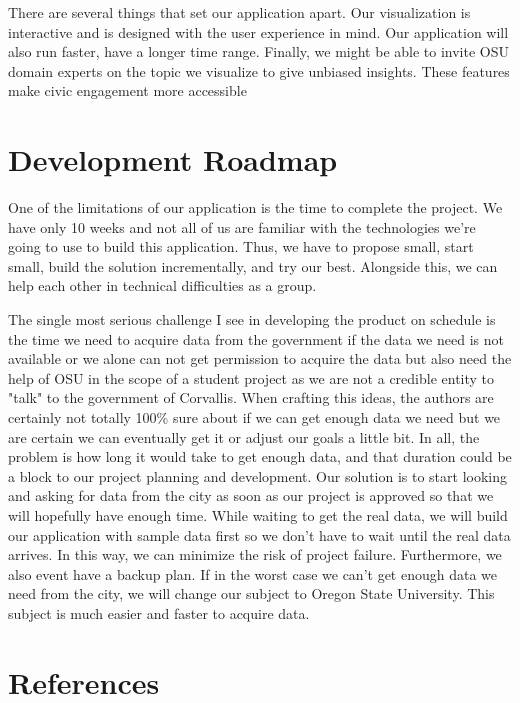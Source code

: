 \documentclass[12pt]{article}
\begin{document}
 

There are several things that set our application apart. Our visualization is interactive and is designed with the user experience in mind. Our application will also run faster, have a longer time range. Finally, we might be able to invite OSU domain experts on the topic we visualize to give unbiased insights. These features make civic engagement more accessible

 

\section{Development Roadmap}

 

One of the limitations of our application is the time to complete the project. We have only 10 weeks and not all of us are familiar with the technologies we're going to use to build this application. Thus, we have to propose small, start small, build the solution incrementally, and try our best. Alongside this, we can help each other in technical difficulties as a group.

 

The single most serious challenge I see in developing the product on schedule is the time we need to acquire data from the government if the data we need is not available or we alone can not get permission to acquire the data but also need the help of OSU in the scope of a student project as we are not a credible entity to "talk" to the government of Corvallis. When crafting this ideas, the authors are certainly not totally 100\% sure about if we can get enough data we need but we are certain we can eventually get it or adjust our goals a little bit. In all, the problem is how long it would take to get enough data, and that duration could be a block to our project planning and development. Our solution is to start looking and asking for data from the city as soon as our project is approved so that we will hopefully have enough time. While waiting to get the real data, we will build our application with sample data first so we don't have to wait until the real data arrives. In this way, we can minimize the risk of project failure. Furthermore, we also event have a backup plan. If in the worst case we can't get enough data we need from the city, we will change our subject to Oregon State University. This subject is much easier and faster to acquire data.

 

\section{References}
\end{document}
